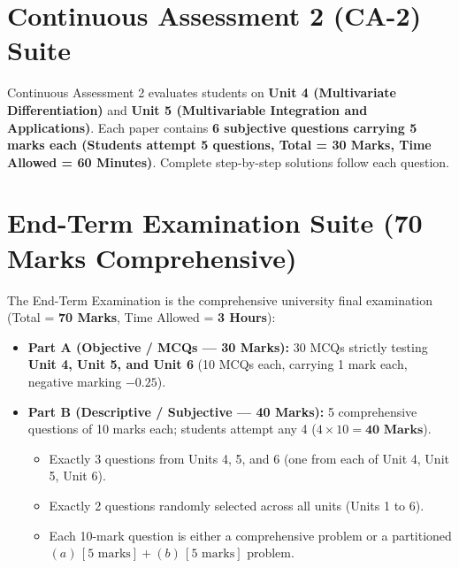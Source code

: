 \documentclass[a4paper,11pt,oneside,openany]{book}
\begin{document}
\chapter{Continuous Assessment 2 (CA-2) Suite}
\label{chap:ca2_suite}
\noindent
Continuous Assessment 2 evaluates students on \textbf{Unit 4 (Multivariate Differentiation)} and \textbf{Unit 5 (Multivariable Integration and Applications)}. Each paper contains \textbf{6 subjective questions carrying 5 marks each (Students attempt 5 questions, Total = 30 Marks, Time Allowed = 60 Minutes)}. Complete step-by-step solutions follow each question.

\newpage

\newpage

\newpage

\newpage


\chapter{End-Term Examination Suite (70 Marks Comprehensive)}
\label{chap:endterm_suite}
\noindent
The End-Term Examination is the comprehensive university final examination (Total = \textbf{70 Marks}, Time Allowed = \textbf{3 Hours}):
\begin{itemize}[leftmargin=8mm]
    \item \textbf{Part A (Objective / MCQs --- 30 Marks):} 30 MCQs strictly testing \textbf{Unit 4, Unit 5, and Unit 6} (10 MCQs each, carrying 1 mark each, negative marking $-0.25$).
    \item \textbf{Part B (Descriptive / Subjective --- 40 Marks):} 5 comprehensive questions of 10 marks each; students attempt any 4 ($4 \times 10 = \mathbf{40\text{ Marks}}$).
    \begin{itemize}
        \item Exactly 3 questions from Units 4, 5, and 6 (one from each of Unit 4, Unit 5, Unit 6).
        \item Exactly 2 questions randomly selected across all units (Units 1 to 6).
        \item Each 10-mark question is either a comprehensive problem or a partitioned $(a)\,[5\text{ marks}] + (b)\,[5\text{ marks}]$ problem.
    \end{itemize}
\end{itemize}

\newpage

\newpage

\newpage

\newpage

\end{document}
